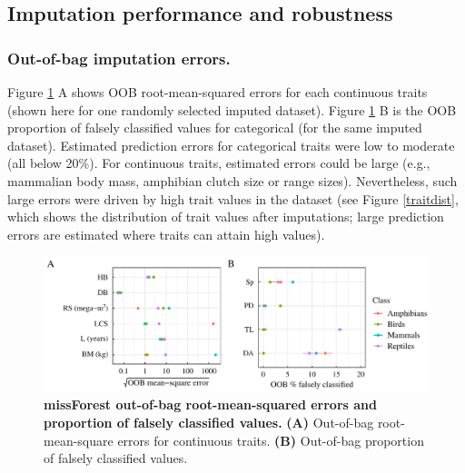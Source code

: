 \pagebreak
\subsection{Imputation performance and robustness}

\subsubsection{Out-of-bag imputation errors.}
Figure \ref{OOBerrors} A shows OOB root-mean-squared errors for each continuous traits (shown here for one randomly selected imputed dataset). Figure \ref{OOBerrors} B is the OOB proportion of falsely classified values for categorical (for the same imputed dataset).
Estimated prediction errors for categorical traits were low to moderate (all below 20\%). For continuous traits, estimated errors could be large (e.g., mammalian body mass, amphibian clutch size  or range sizes). Nevertheless, such large errors were driven by high trait values in the dataset (see Figure \ref{traitdist}, which shows the distribution of trait values after imputations; large prediction errors are estimated where traits can attain high values). 
 
\begin{figure}[h!]
\centering
\includegraphics[scale=0.75]{figures/chapter2/Imputation_errors/MSE_PFC}
\caption[missForest out-of-bag root-mean-square errors and proportion of falsely classified values]{\textbf{missForest out-of-bag root-mean-squared errors and proportion of falsely classified values.} \textbf{(A)} Out-of-bag root-mean-square errors for continuous traits. \textbf{(B)} Out-of-bag proportion of falsely classified values.}
\label{OOBerrors}
\end{figure}

